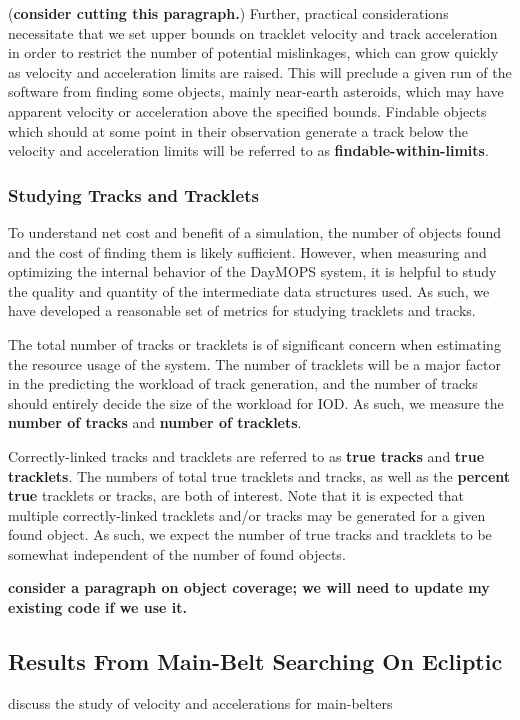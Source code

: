 \documentclass[12pt,preprint]{aastex}
\begin{document}
(\textbf{consider cutting this paragraph.}) Further, practical
considerations necessitate that we set upper bounds on tracklet
velocity and track acceleration in order to restrict the number of
potential mislinkages, which can grow quickly as velocity and
acceleration limits are raised.  This will preclude a given run of the
software from finding some objects, mainly near-earth asteroids, which
may have apparent velocity or acceleration above the specified
bounds. Findable objects which should at some point in their
observation generate a track below the velocity and acceleration
limits will be referred to as \textbf{findable-within-limits}.

\subsubsection{Studying Tracks and Tracklets}

To understand net cost and benefit of a simulation, the number of
objects found and the cost of finding them is likely sufficient.
However, when measuring and optimizing the internal behavior of the
DayMOPS system, it is helpful to study the quality and quantity of the
intermediate data structures used. As such, we have developed a
reasonable set of metrics for studying tracklets and tracks.

The total number of tracks or tracklets is of significant concern when
estimating the resource usage of the system.  The number of tracklets
will be a major factor in the predicting the workload of track
generation, and the number of tracks should entirely decide the size
of the workload for IOD.  As such, we measure the \textbf{number of
  tracks} and \textbf{number of tracklets}.

Correctly-linked tracks and tracklets are referred to as \textbf{true
  tracks} and \textbf{true tracklets}. The numbers of total true
tracklets and tracks, as well as the \textbf{percent true} tracklets
or tracks, are both of interest. Note that it is expected that
multiple correctly-linked tracklets and/or tracks may be generated for a
given found object. As such, we expect the number of true tracks and
tracklets to be somewhat independent of the number of found objects.

\textbf{consider a paragraph on object coverage; we will need to
  update my existing code if we use it.}




\subsection{Results From Main-Belt Searching On Ecliptic}
discuss the study of velocity and accelerations for main-belters
\end{document}
